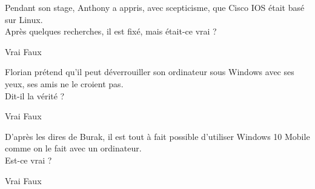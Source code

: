 \documentclass[12pt, a4paper]{exam}
\begin{document}
\begin{questions}
    \question Pendant son stage, Anthony a appris, avec scepticisme, que Cisco
    IOS était basé sur Linux. \\
    Après quelques recherches, il est fixé, mais était-ce vrai ?
    \begin{checkboxes}
      \choice Vrai
      \choice Faux
    \end{checkboxes}

    \question Florian prétend qu’il peut déverrouiller son ordinateur sous
    Windows avec ses yeux, ses amis ne le croient pas. \\
    Dit-il la vérité ?
    \begin{checkboxes}
      \choice Vrai
      \choice Faux
    \end{checkboxes}

    \question D’après les dires de Burak, il est tout à fait possible d’utiliser
    Windows 10 Mobile comme on le fait avec un ordinateur. \\
    Est-ce vrai ?
    \begin{checkboxes}
      \choice Vrai
      \choice Faux
    \end{checkboxes}
  \end{questions}
\end{document}
